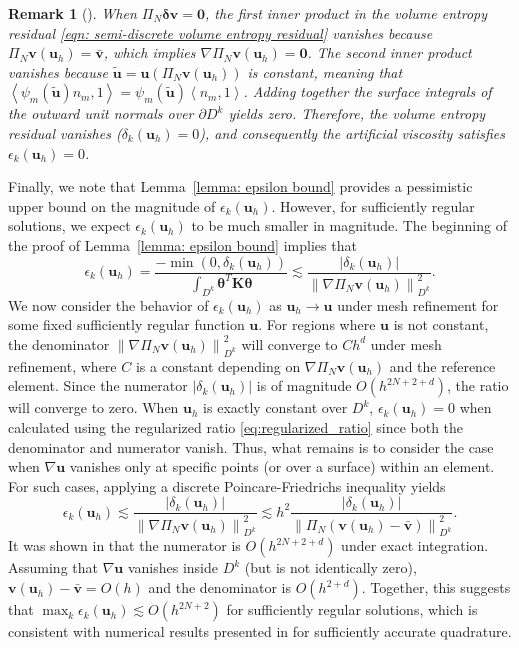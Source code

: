 \documentclass{elsarticle}
\theoremstyle{definition}
\theoremstyle{plain}
\theoremstyle{plain}
\newcommand{\nor}[1]{\left\| #1 \right\|} %
\newcommand{\LRa}[1]{\left\langle #1 \right\rangle} %
\newcommand{\LRb}[1]{\left| #1 \right|} %
\newcommand{\reftwo}[1]{{\color{blue}#1}}
\renewcommand{\reftwo}[1]{#1}
\newtheorem{remark}{Remark}
\begin{document}
\reftwo{\begin{remark}[]
    When $\Pi_N \bm{\delta v} = \bm{0}$, the first inner product in the volume entropy residual \eqref{eqn: semi-discrete volume entropy residual} vanishes because $\Pi_N \bm{v}(\bm{u}_h) = \bar{\bm{v}}$, which implies $\nabla \Pi_N \bm{v}(\bm{u}_h) = \bm{0}$. The second inner product vanishes because $\tilde{\bm{u}} = \bm{u}(\Pi_N \bm{v}(\bm{u}_h))$ is constant, meaning that $\LRa{\psi_m(\bm{\tilde{u}})n_m,1} = \psi_m(\bm{\tilde{u}})\LRa{n_m,1}$. Adding together the surface integrals of the outward unit normals over $\partial D^k$ yields zero. Therefore, the volume entropy residual vanishes ($\delta_k(\bm{u}_h) = 0$), and consequently the artificial viscosity satisfies $\epsilon_k(\bm{u}_h) = 0$.
\end{remark}}


Finally, we note that Lemma~\ref{lemma: epsilon bound} provides a pessimistic upper bound on the magnitude of $\epsilon_k(\bm{u}_h)$. However, for sufficiently regular solutions, we expect $\epsilon_k(\bm{u}_h)$ to be much smaller in magnitude. The beginning of the proof of Lemma~\ref{lemma: epsilon bound} implies that
\[
\epsilon_k(\bm{u}_h) = \frac{-\min(0, \delta_k(\bm{u}_h))}{\int_{D^k} \bm{\theta}^T\bm{K}\bm{\theta}} \lesssim \frac{\LRb{\delta_k(\bm{u}_h)}}{\nor{\nabla \Pi_N \bm{v}(\bm{u}_h)}^2_{D^k}}. 
\]
We now consider the behavior of $\epsilon_k(\bm{u}_h)$ as $\bm{u}_h \rightarrow \bm{u}$ under mesh refinement for some fixed sufficiently regular function $\bm{u}$. \reftwo{For regions where $\bm{u}$ is not constant, the denominator $\nor{\nabla \Pi_N \bm{v}(\bm{u}_h)}^2_{D^k}$ will converge to $Ch^d$ under mesh refinement, where $C$ is a constant depending on $\nabla \Pi_N \bm{v}(\bm{u}_h)$ and the reference element. Since the numerator $|\delta_k(\bm{u}_h)|$ is of magnitude $O(h^{2N+2+d})$, the ratio will converge to zero.} When $\bm{u}_h$ is exactly constant over $D^k$, $\epsilon_k(\bm{u}_h) = 0$ when calculated using the regularized ratio \eqref{eq:regularized_ratio} since both the denominator and numerator vanish. Thus, what remains is to consider the case when $\nabla\bm{u}$ vanishes only at specific points (or over a surface) within an element. For such cases, applying a discrete Poincare-Friedrichs inequality \cite{brenner2003poincare, carstensen2018constants} yields
\[
\epsilon_k(\bm{u}_h) \lesssim \frac{\LRb{\delta_k(\bm{u}_h)}}{\nor{\nabla \Pi_N \bm{v}(\bm{u}_h)}^2_{D^k}} \lesssim h^2 \frac{\LRb{\delta_k(\bm{u}_h)}}{\nor{\Pi_N (\bm{v}(\bm{u}_h) - \bar{\bm{v}})}^2_{D^k}}.
\]
It was shown in \cite{chan2025artificial} that the numerator is  $O(h^{2N+2+d})$ under exact integration. Assuming that $\nabla \bm{u}$ vanishes inside $D^k$ (but is not identically zero), $\bm{v}(\bm{u}_h) - \bar{\bm{v}} = O(h)$ and the denominator is $O(h^{2+d})$. Together, this suggests that $\max_k \epsilon_k(\bm{u}_h) \lesssim O(h^{2N+2})$ for sufficiently regular solutions, which is consistent with numerical results presented in \cite{chan2025artificial} for sufficiently accurate quadrature. 
\end{document}
